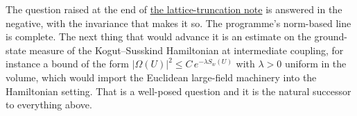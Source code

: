 \documentclass[11pt,a4paper]{article}
\begin{document}
The question raised at the end of
\href{lattice-truncation-uniform.md}{the lattice-truncation note} is
answered in the negative, with the invariance that makes it so. The
programme's norm-based line is complete. The next thing that would
advance it is an estimate on the ground-state measure of the
Kogut--Susskind Hamiltonian at intermediate coupling, for instance a
bound of the form \(|\Omega(U)|^2\le C\,e^{-\lambda S_w(U)}\) with
\(\lambda>0\) uniform in the volume, which would import the Euclidean
large-field machinery into the Hamiltonian setting. That is a well-posed
question and it is the natural successor to everything above.
\end{document}
